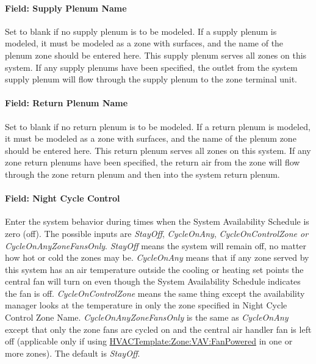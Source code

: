 \paragraph{Field: Supply Plenum Name}\label{field-supply-plenum-name-10}

Set to blank if no supply plenum is to be modeled. If a supply plenum is modeled, it must be modeled as a zone with surfaces, and the name of the plenum zone should be entered here. This supply plenum serves all zones on this system. If any supply plenums have been specified, the outlet from the system supply plenum will flow through the supply plenum to the zone terminal unit.

\paragraph{Field: Return Plenum Name}\label{field-return-plenum-name-11}

Set to blank if no return plenum is to be modeled. If a return plenum is modeled, it must be modeled as a zone with surfaces, and the name of the plenum zone should be entered here. This return plenum serves all zones on this system. If any zone return plenums have been specified, the return air from the zone will flow through the zone return plenum and then into the system return plenum.

\paragraph{Field: Night Cycle Control}\label{field-night-cycle-control-4}

Enter the system behavior during times when the System Availability Schedule is zero (off). The possible inputs are \emph{StayOff}, \emph{CycleOnAny}, \emph{CycleOnControlZone or CycleOnAnyZoneFansOnly}. \emph{StayOff} means the system will remain off, no matter how hot or cold the zones may be. \emph{CycleOnAny} means that if any zone served by this system has an air temperature outside the cooling or heating set points the central fan will turn on even though the System Availability Schedule indicates the fan is off. \emph{CycleOnControlZone} means the same thing except the availability manager looks at the temperature in only the zone specified in Night Cycle Control Zone Name. \emph{CycleOnAnyZoneFansOnly} is the same as \emph{CycleOnAny} except that only the zone fans are cycled on and the central air handler fan is left off (applicable only if using \hyperref[hvactemplatezonevavfanpowered]{HVACTemplate:Zone:VAV:FanPowered} in one or more zones). The default is \emph{StayOff}.

